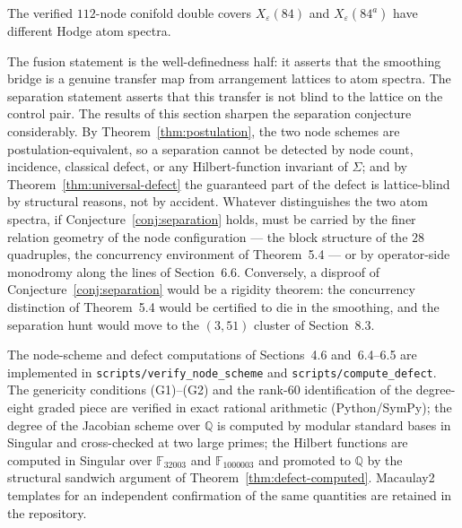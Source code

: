 \begin{conjecture}[Separation]\label{conj:separation}
The verified $112$-node conifold double covers $X_\varepsilon(84)$ and
$X_\varepsilon(84^{a})$ have different Hodge atom spectra.
\end{conjecture}

The fusion statement is the well-definedness half: it asserts that the
smoothing bridge is a genuine transfer map from arrangement lattices to
atom spectra. The separation statement asserts that this transfer is not
blind to the lattice on the control pair. The results of this section
sharpen the separation conjecture considerably. By
Theorem~\ref{thm:postulation}, the two node schemes are
postulation-equivalent, so a separation cannot be detected by node count,
incidence, classical defect, or any Hilbert-function invariant of
$\Sigma$; and by Theorem~\ref{thm:universal-defect} the guaranteed part of
the defect is lattice-blind by structural reasons, not by accident.
Whatever distinguishes the two atom spectra, if
Conjecture~\ref{conj:separation} holds, must be carried by the finer
relation geometry of the node configuration --- the block structure of the
$28$ quadruples, the concurrency environment of Theorem~5.4 --- or by
operator-side monodromy along the lines of Section~6.6. Conversely, a
disproof of Conjecture~\ref{conj:separation} would be a rigidity theorem:
the concurrency distinction of Theorem~5.4 would be certified to die in the
smoothing, and the separation hunt would move to the $(3,51)$ cluster of
Section~8.3.



The node-scheme and defect computations of Sections~4.6 and~6.4--6.5 are
implemented in \texttt{scripts/verify\_node\_scheme} and
\texttt{scripts/compute\_defect}. The genericity conditions (G1)--(G2) and
the rank-$60$ identification of the degree-eight graded piece are verified
in exact rational arithmetic (Python/SymPy); the degree of the Jacobian
scheme over $\mathbb{Q}$ is computed by modular standard bases in Singular
and cross-checked at two large primes; the Hilbert functions are computed
in Singular over $\mathbb{F}_{32003}$ and $\mathbb{F}_{1000003}$ and
promoted to $\mathbb{Q}$ by the structural sandwich argument of
Theorem~\ref{thm:defect-computed}. Macaulay2 templates for an independent
confirmation of the same quantities are retained in the repository.

